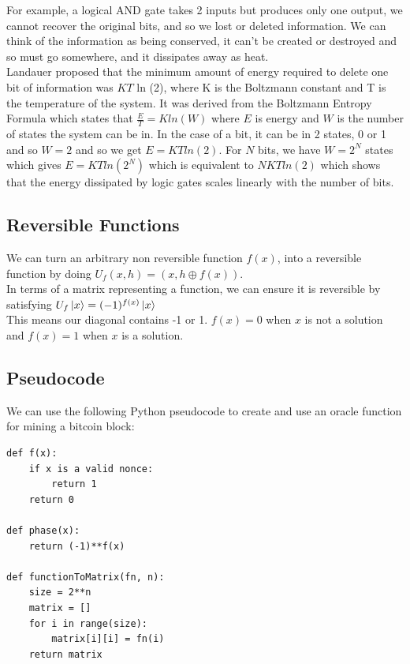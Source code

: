 \documentclass[11pt]{article} %
\begin{document}
\noindent For example, a logical AND gate takes 2 inputs but produces only one output, we cannot recover the original bits, and so we lost or deleted information.  We can think of the information as being conserved, it can't be created or destroyed and so must go somewhere, and it dissipates away as heat.\\

\noindent Landauer proposed that the minimum amount of energy required to delete one bit of information was $K T$ ln (2), where K is the Boltzmann constant and T is the temperature of the system. It was derived from the Boltzmann Entropy Formula which states that $\frac{E}{T} = K ln(W)$ where $E$ is energy and $W$ is the number of states the system can be in. In the case of a bit, it can be in 2 states, 0 or 1 and so $W = 2$ and so we get $E = K T ln(2)$. For $N$ bits, we have $W = 2^{N}$ states which gives $E = K T ln(2^N)$ which is equivalent to $N K T ln (2)$ which shows that the energy dissipated by logic gates scales linearly with the number of bits.\\

\subsection{Reversible Functions}{}


\noindent We can turn an arbitrary non reversible function $f(x)$, into a reversible function by doing $U_{f} (x, h) = (x, h \oplus  f(x))$. \\

\noindent In terms of a matrix representing a function, we can ensure it is reversible by satisfying $U_f \ket{x} = (-1)^{f(x)} \ket{x}$\\

\noindent This means our diagonal contains -1 or 1. $f(x) = 0$ when $x$ is not a solution and $f(x) = 1$ when $x$ is a solution.

 \subsection{Pseudocode}{}
We can use the following Python pseudocode to create and use an oracle function for mining a bitcoin block:
\begin{Verbatim}[tabsize=4]
def f(x):	
	if x is a valid nonce:
		return 1
	return 0

def phase(x):
	return (-1)**f(x)

def functionToMatrix(fn, n):
	size = 2**n
	matrix = []
	for i in range(size):
		matrix[i][i] = fn(i)
	return matrix
	
\end{Verbatim} 
\end{document}
